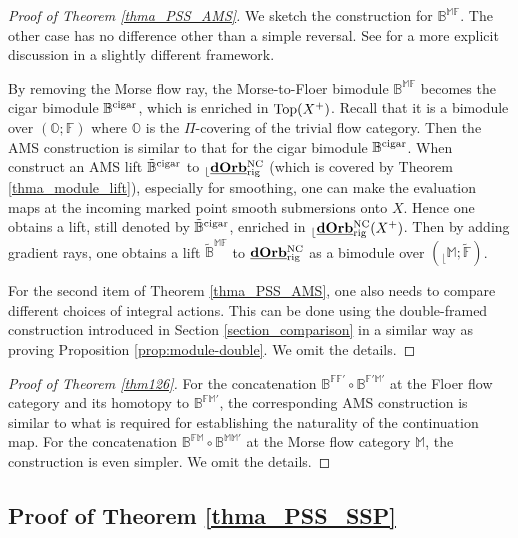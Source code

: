 \documentclass[reqno, 10pt]{amsart}
\numberwithin{equation}{section}
\numberwithin{equation}{section}
\theoremstyle{definition}
\theoremstyle{remark}
\newcommand{\mb}{\mathbb}
\renewcommand{\outer}{{}_{\lfloor}}
\newcommand{\uds}[1]{\underline{\smash{#1}}}
\begin{document}
\begin{proof}[Proof of Theorem \ref{thma_PSS_AMS}]We sketch the construction for $\mb{B}^{\mb{MF}}$. The other case has no difference other than a simple reversal. See \cite[Section 7]{Bai_Xu_Arnold} for a more explicit discussion in a slightly different framework.

By removing the Morse flow ray, the Morse-to-Floer bimodule ${\mb B}^{\mb{MF}}$ becomes the cigar bimodule $\mb{B}^{\rm cigar}$, which is enriched in ${\rm Top}(X^+)$. Recall that it is a bimodule over $({\mb O}; {\mb F})$ where ${\mb O}$ is the $\Pi$-covering of the trivial flow category. Then the AMS construction is similar to that for the cigar bimodule $\mb{B}^{\rm cigar}$. When construct an AMS lift $\tilde {\mb B}^{\rm cigar}$ to $\outer \uds{\bf dOrb}_{\rm rig}^{\rm NC}$ (which is covered by Theorem \ref{thma_module_lift}), especially for smoothing, one can make the evaluation maps at the incoming marked point smooth submersions onto $X$. Hence one obtains a lift, still denoted by $\tilde {\mb B}^{\rm cigar}$, enriched in $\outer \uds{\bf dOrb}_{\rm rig}^{\rm NC}(X^+)$. Then by adding gradient rays, one obtains a lift $\tilde {\mb B}^{\mb{MF}}$ to $\uds{\bf dOrb}_{\rm rig}^{\rm NC}$ as a bimodule over $(\outer \mb{M}; \tilde {\mb F})$. 

For the second item of Theorem \ref{thma_PSS_AMS}, one also needs to compare different choices of integral actions. This can be done using the double-framed construction introduced in Section \ref{section_comparison} in a similar way as proving Proposition \ref{prop:module-double}. We omit the details.
\end{proof}

\begin{proof}[Proof of Theorem \ref{thm126}]
For the concatenation $\mb{B}^{\mb{FF}'} \circ \mb{B}^{\mb{F'}\mb{M}'}$ at the Floer flow category and its homotopy to $\mb{B}^{\mb{F}\mb{M}'}$, the corresponding AMS construction is similar to what is required for establishing the naturality of the continuation map. For the concatenation $\mb{B}^{\mb{FM}} \circ \mb{B}^{\mb{MM}'}$ at the Morse flow category $\mb{M}$, the construction is even simpler. We omit the details. 
\end{proof}


\subsection{Proof of Theorem \ref{thma_PSS_SSP}}\label{subsection_PSS_triangle}
\end{document}
